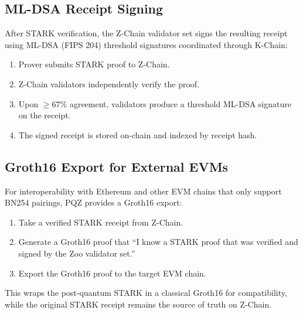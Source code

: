 \subsection{ML-DSA Receipt Signing}

After STARK verification, the Z-Chain validator set signs the resulting receipt using ML-DSA (FIPS 204) threshold signatures coordinated through K-Chain:

\begin{enumerate}
\item Prover submits STARK proof to Z-Chain.
\item Z-Chain validators independently verify the proof.
\item Upon $\geq 67\%$ agreement, validators produce a threshold ML-DSA signature on the receipt.
\item The signed receipt is stored on-chain and indexed by receipt hash.
\end{enumerate}

\subsection{Groth16 Export for External EVMs}

For interoperability with Ethereum and other EVM chains that only support BN254 pairings, PQZ provides a Groth16 export:

\begin{enumerate}
\item Take a verified STARK receipt from Z-Chain.
\item Generate a Groth16 proof that ``I know a STARK proof that was verified and signed by the Zoo validator set.''
\item Export the Groth16 proof to the target EVM chain.
\end{enumerate}

This wraps the post-quantum STARK in a classical Groth16 for compatibility, while the original STARK receipt remains the source of truth on Z-Chain.

